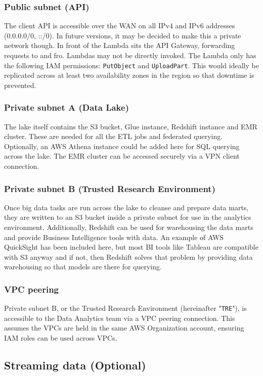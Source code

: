 \documentclass[10pt]{article}
\begin{document}
\subsubsection{Public subnet (API)}
The client API is accessible over the WAN on all IPv4 and IPv6 addresses (0.0.0.0/0, ::/0). In future versions, it may be decided to make this a private network though. In front of the Lambda sits the API Gateway, forwarding requests to and fro. Lambdas may not be directly invoked. The Lambda only has the following IAM permissions: \texttt{PutObject} and \texttt{UploadPart}. This would ideally be replicated across at least two availability zones in the region so that downtime is prevented.
\subsubsection{Private subnet A (Data Lake)}
The lake itself contains the S3 bucket, Glue instance, Redshift instance and EMR cluster. These are needed for all the ETL jobs and federated querying. Optionally, an AWS Athena instance could be added here for SQL querying across the lake. The EMR cluster can be accessed securely via a VPN client connection.
\subsubsection{Private subnet B (Trusted Research Environment)}
Once big data tasks are run across the lake to cleanse and prepare data marts, they are written to an S3 bucket inside a private subnet for use in the analytics environment. Additionally, Redshift can be used for warehousing the data marts and provide Business Intelligence tools with data. An example of AWS QuickSight has been included here, but most BI tools like Tableau are compatible with S3 anyway and if not, then Redshift solves that problem by providing data warehousing so that models are there for querying.
\subsubsection{VPC peering}
Private subnet B, or the Trusted Research Environment (hereinafter "\texttt{TRE}"), is accessible to the Data Analytics team via a VPC peering connection. This assumes the VPCs are held in the same AWS Organization account, ensuring IAM roles can be used across VPCs.

\iffalse
\subsection{Streaming data (Optional)}
\end{document}
